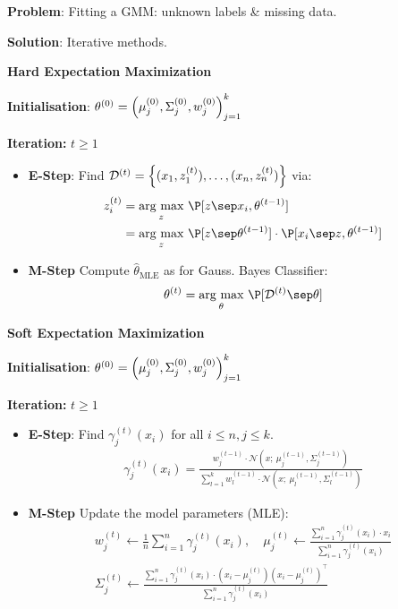 \textbf{Problem}: Fitting a GMM: unknown labels \& missing data.

\textbf{Solution}: Iterative methods.\\

\method \textbf{Hard Expectation Maximization}\\

\textbf{Initialisation}: $\theta^{(0)} = \Bigl( \mu_j^{(0)}, \Sigma_j^{(0)}, w_j^{(0)} \Bigr)_{j=1}^k$

\textbf{Iteration:} $t \geq 1$
\begin{itemize}
    \item \textbf{E-Step}: Find $ \mathcal{D}^{(t)} = \Bigl\{ (x_1, z_1^{(t)}),\ldots, (x_n, z_n^{(t)}) \Bigr\}$ via:
    \begin{align*}
        z_i^{(t)}   &= \underset{z}{\text{arg max}}\ \P[z \sep x_i, \theta^{(t-1)}] \\
                    &= \underset{z}{\text{arg max}}\ \P[z \sep \theta^{(t-1)}]\cdot\P[x_i \sep z, \theta^{(t-1)}]
    \end{align*}
    \item \textbf{M-Step} Compute $\hat{\theta}_\text{MLE}$ as for Gauss. Bayes Classifier:
    \begin{align*}
        \theta^{(t)} = \underset{\theta}{\text{arg max}}\ \P[\mathcal{D}^{(t)} \sep  \theta]
    \end{align*}
\end{itemize}

\method \textbf{Soft Expectation Maximization}\\

\textbf{Initialisation}: $\theta^{(0)} = \Bigl( \mu_j^{(0)}, \Sigma_j^{(0)}, w_j^{(0)} \Bigr)_{j=1}^k$

\textbf{Iteration:} $t \geq 1$
\begin{itemize}
    \item \textbf{E-Step}: Find $\gamma_j^{(t)}(x_i)$ for all $i\leq n,j\leq k$.\\
    \begin{align*}
        \gamma_j^{(t)}(x_i) = \frac{w_j^{(t-1)}\cdot\mathcal{N}(x;\ \mu_j^{(t-1)}, \Sigma_j^{(t-1)})}{\sum_{l=1}^k w_l^{(t-1)}\cdot\mathcal{N}(x;\ \mu_l^{(t-1)}, \Sigma_l^{(t-1)})}
    \end{align*}
    \item \textbf{M-Step} Update the model parameters (MLE):
    \begin{align*}
        w_j^{(t)} \gets \frac{1}{n}\sum_{i=1}^{n}\gamma_j^{(t)}(x_i),\quad \mu_j^{(t)} \gets \frac{\sum_{i=1}^{n}\gamma_j^{(t)}(x_i)\cdot x_i}{\sum_{i=1}^{n}\gamma_j^{(t)}(x_i)} \\
        \Sigma_j^{(t)} \gets \frac{\sum_{i=1}^{n} \gamma_j^{(t)}(x_i)\cdot(x_i-\mu_j^{(t)})(x_i-\mu_j^{(t)})^\top}{\sum_{i=1}^{n}\gamma_j^{(t)}(x_i)}
    \end{align*}
\end{itemize}

